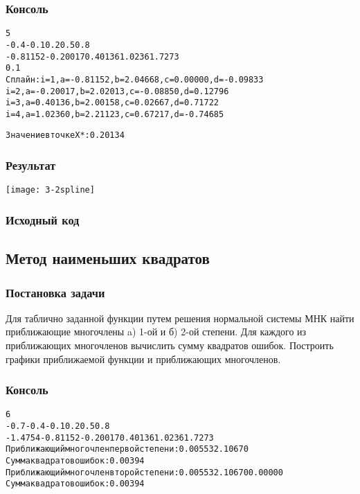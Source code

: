 \subsubsection{Консоль}
\begin{alltt}
5
-0.4 -0.1 0.2 0.5 0.8
-0.81152 -0.20017 0.40136 1.0236 1.7273
0.1
Сплайн: i = 1, a = -0.81152, b = 2.04668, c = 0.00000,d = -0.09833
i = 2, a = -0.20017, b = 2.02013, c = -0.08850,d = 0.12796
i = 3, a = 0.40136, b = 2.00158, c = 0.02667,d = 0.71722
i = 4, a = 1.02360, b = 2.21123, c = 0.67217,d = -0.74685

Значение в точке X*: 0.20134
\end{alltt}
\pagebreak

\subsubsection{Результат}
\begin{center}
\texttt{[image: 3-2spline]}
\end{center}
\pagebreak

\subsubsection{Исходный код}

\pagebreak

\subsection{Метод наименьших квадратов}

\subsubsection{Постановка задачи}
Для таблично заданной функции путем решения нормальной системы МНК найти приближающие многочлены a) 1-ой и б) 2-ой степени. Для каждого из приближающих многочленов вычислить сумму квадратов ошибок. Построить графики приближаемой функции и приближающих многочленов.

\subsubsection{Консоль}
\begin{alltt}
6
-0.7 -0.4 -0.1 0.2 0.5 0.8
-1.4754 -0.81152 -0.20017 0.40136 1.0236 1.7273
Приближающий многочлен первой степени: 0.00553 2.10670
Сумма квадратов ошибок: 0.00394
Приближающий многочлен второй степени: 0.00553 2.10670 0.00000
Сумма квадратов ошибок: 0.00394
\end{alltt}
\pagebreak

